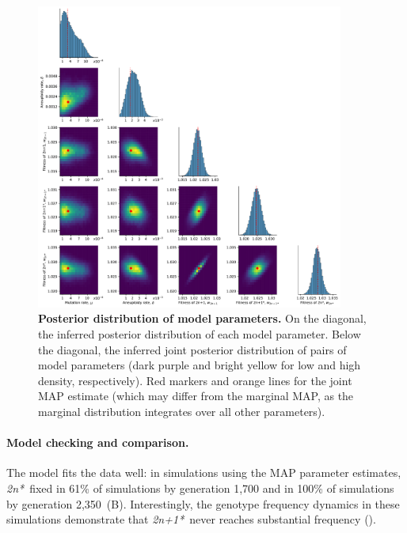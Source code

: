\documentclass[12pt]{extarticle}
\newcommand{\eumt}{\emph{2n*}}
\newcommand{\anmt}{\emph{2n+1*}}
\begin{document}
\begin{figure}[p]
  \centering
\includegraphics[width=0.9\textwidth]{../figures/posterior.pdf}
  \caption{
  \textbf{Posterior distribution of model parameters.}
On the diagonal, the inferred posterior distribution of each model parameter. 
Below the diagonal, the inferred joint posterior distribution of pairs of model parameters (dark purple and bright yellow for low and high density, respectively). Red markers and orange lines for the joint MAP estimate (which may differ from the marginal MAP, as the marginal distribution integrates over all other parameters).
} 
  \label{fig:posterior}
\end{figure}


\paragraph{Model checking and comparison.}
The model fits the data well: in simulations using the MAP parameter estimates, \eumt\ fixed in 61\% of simulations by generation 1,700 and in 100\% of simulations by generation 2,350~(B). 
Interestingly, the genotype frequency dynamics in these simulations demonstrate that \anmt\ never reaches substantial frequency ().
\end{document}
